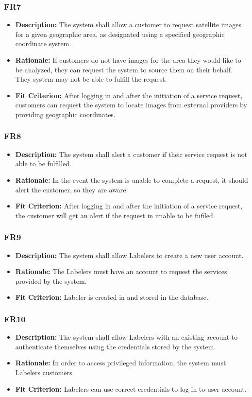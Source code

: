 \documentclass[12pt]{article}
\begin{document}
\subsubsection*{FR7}
\begin{itemize}
  \item \textbf{Description:} The system shall allow a customer to request satellite images for a given geographic area, as designated using a specified geographic coordinate system.
  \item \textbf{Rationale:} If customers do not have images for the area they would like to be analyzed, they can request the system to source them on their behalf. They system may not be able to fulfill the request.
  \item \textbf{Fit Criterion:} After logging in and after the initiation of a service request, customers can request the system to locate images from external providers by providing geographic coordinates.
\end{itemize}
\subsubsection*{FR8}
\begin{itemize}
  \item \textbf{Description:} The system shall alert a customer if their service request is not able to be fulfilled.
  \item \textbf{Rationale:} In the event the system is unable to complete a request, it should alert the customer, so they are aware.
  \item \textbf{Fit Criterion:} After logging in and after the initiation of a service request, the customer will get an alert if the request in unable to be fufiled.
\end{itemize}
\subsubsection*{FR9}
\begin{itemize}
  \item \textbf{Description:} The system shall allow Labelers to create a new user account.
  \item \textbf{Rationale:} The Labelers must have an account to request the services provided by the system.
  \item \textbf{Fit Criterion:} Labeler is created in and stored in the database.
\end{itemize}
\subsubsection*{FR10}
\begin{itemize}
  \item \textbf{Description:} The system shall allow Labelers with an existing account to authenticate themselves using the credentials stored by the system.
  \item \textbf{Rationale:} In order to access privileged information, the system must Labelers customers.
\item \textbf{Fit Criterion:} Labelers can use correct credentials to log in to user account.
\end{itemize}
\end{document}
